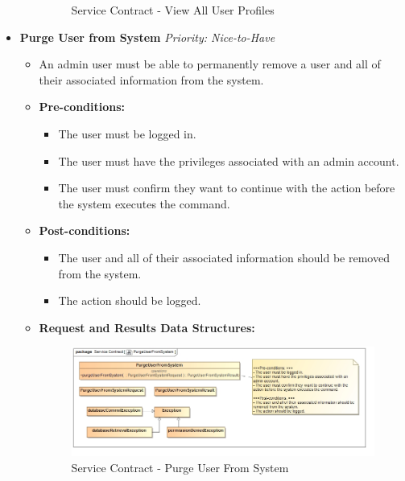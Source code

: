 \documentclass{article}
\begin{document}
\begin{itemize}
\begin{itemize}
\begin{figure}[H]
							\caption{Service Contract - View All User Profiles}
						\end{figure}
					\end{itemize}
					
					\cleardoublepage
					\item \textbf{Purge User from System} \hfill \textit{Priority: Nice-to-Have}
					\begin{itemize}
						\item An admin user must be able to permanently remove a user and all of their associated information from the system.
						\item \textbf{Pre-conditions:}
						\begin{itemize}
							\item The user must be logged in.
							\item The user must have the privileges associated with an admin account.
							\item The user must confirm they want to continue with the action before the system executes the command.
						\end{itemize}
						\item \textbf{Post-conditions:}
						\begin{itemize}
							\item The user and all of their associated information should be removed from the system.
							\item The action should be logged.
						\end{itemize}
						\item \textbf{Request and Results Data Structures:}
						\begin{figure}[H]
							\includegraphics[width=\linewidth]{../Diagrams/ServiceContracts/User subsystem/PurgeUserFromSystem.jpg}
							\caption{Service Contract - Purge User From System}
						\end{figure}
					\end{itemize}
					

\end{itemize}
\end{document}
